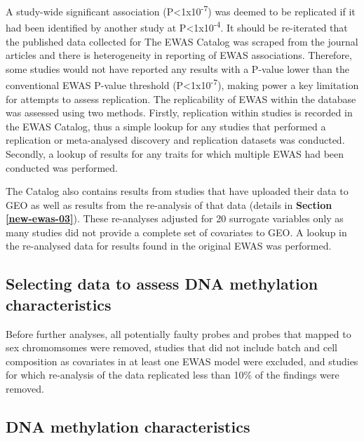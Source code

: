 \documentclass[11pt,oneside]{bristolthesis}
\begin{document}
A study-wide significant association (P\textless1x10\textsuperscript{-7}) was deemed to be replicated if it had been identified by another study at P\textless1x10\textsuperscript{-4}. It should be re-iterated that the published data collected for The EWAS Catalog was scraped from the journal articles and there is heterogeneity in reporting of EWAS associations. Therefore, some studies would not have reported any results with a P-value lower than the conventional EWAS P-value threshold (P\textless1x10\textsuperscript{-7}), making power a key limitation for attempts to assess replication. The replicability of EWAS within the database was assessed using two methods. Firstly, replication within studies is recorded in the EWAS Catalog, thus a simple lookup for any studies that performed a replication or meta-analysed discovery and replication datasets was conducted. Secondly, a lookup of results for any traits for which multiple EWAS had been conducted was performed.

The Catalog also contains results from studies that have uploaded their data to GEO as well as results from the re-analysis of that data (details in \textbf{Section \ref{new-ewas-03}}). These re-analyses adjusted for 20 surrogate variables only as many studies did not provide a complete set of covariates to GEO. A lookup in the re-analysed data for results found in the original EWAS was performed.

\hypertarget{selecting-data-to-assess-dna-methylation-characteristics}{%
\subsection{Selecting data to assess DNA methylation characteristics}\label{selecting-data-to-assess-dna-methylation-characteristics}}

Before further analyses, all potentially faulty probes and probes that mapped to sex chromomsomes were removed, studies that did not include batch and cell composition as covariates in at least one EWAS model were excluded, and studies for which re-analysis of the data replicated less than 10\% of the findings were removed.

\hypertarget{dna-methylation-characteristics}{%
\subsection{DNA methylation characteristics}\label{dna-methylation-characteristics}}
\end{document}

